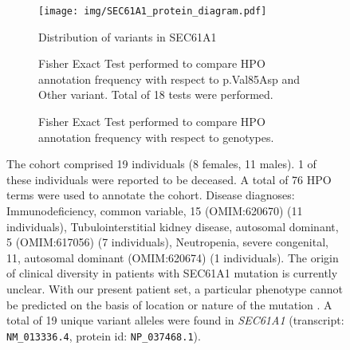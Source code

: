 \begin{figure}[htbp]
\centering
\begin{subfigure}[b]{0.95\textwidth}
\centering
\texttt{[image: img/SEC61A1\_protein\_diagram.pdf]} 
\captionsetup{justification=raggedright,singlelinecheck=false}
\caption{Distribution of variants in SEC61A1}
\end{subfigure}

\vspace{2em}

\begin{subfigure}[b]{0.95\textwidth}
\centering
{}
\captionsetup{justification=raggedright,singlelinecheck=false}
\caption{Fisher Exact Test performed to compare HPO annotation frequency with respect to p.Val85Asp and Other variant. Total of
        18 tests were performed.}
\end{subfigure}
\vspace{2em}
\begin{subfigure}[b]{0.95\textwidth}
\centering
{}
\captionsetup{justification=raggedright,singlelinecheck=false}
\caption{Fisher Exact Test performed to compare HPO annotation frequency with respect to genotypes.}
\end{subfigure}

\vspace{2em}

\caption{The cohort comprised 19 individuals (8 females, 11 males). 1 of these individuals were reported to be deceased. 
A total of 76 HPO terms were used to annotate the cohort. Disease diagnoses: Immunodeficiency, common variable, 15 (OMIM:620670) (11 individuals), 
Tubulointerstitial kidney disease, autosomal dominant, 5 (OMIM:617056) (7 individuals), Neutropenia, severe congenital, 11, autosomal dominant (OMIM:620674) 
(1 individuals). The origin of clinical diversity in patients with SEC61A1 mutation is currently unclear. 
With our present patient set, a particular phenotype cannot be predicted on the basis of location or nature of the mutation \cite{PMID_32325141}. 
A total of 19 unique variant alleles were found in \textit{SEC61A1} (transcript: \texttt{NM\_013336.4}, protein id: \texttt{NP\_037468.1}).}
\end{figure}
